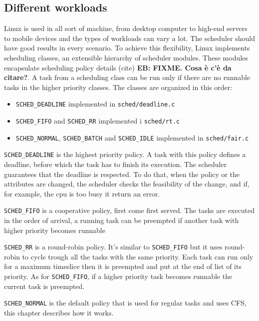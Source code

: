 \documentclass[10pt]{book}
\newcommand{\mycomment}[1]{\textbf{#1}}  %
\begin{document}
\subsection{Different workloads}  %
Linux is used in all sort of machine, from desktop computer to high-end servers to mobile devices and the types of workloads can vary a lot. The scheduler should have good results in every scenario. To achieve this flexibility, Linux implements scheduling classes, an extensible hierarchy of scheduler modules. These modules encapsulate scheduling policy details (cite) \mycomment{EB: FIXME. Cosa \`e c'\`e da citare?}. A task from a scheduling class can be run only if there are no runnable tasks in the higher priority classes. The classes are organized in this order: 
\begin{itemize}
\item \verb|SCHED_DEADLINE| implemented in \verb|sched/deadline.c|
\item \verb|SCHED_FIFO| and \verb|SCHED_RR| implemented i
  \verb|sched/rt.c|
\item \verb|SCHED_NORMAL|, \verb|SCHED_BATCH| and
  \verb|SCHED_IDLE| %
  implemented in \verb|sched/fair.c|%
\end{itemize}

\verb|SCHED_DEADLINE| is the highest priority policy. A task with this policy defines a deadline, before which the task has to finish its execution. The scheduler guarantees that the deadline is respected. To do that, when the policy or the attributes are changed, the scheduler checks the feasibility of the change, and if, for example, the cpu is too busy it return an error.

\verb|SCHED_FIFO| is a cooperative policy, first come first served. The tasks are executed in the order of arrival, a running task can be preempted if another task with higher priority becomes runnable

\verb|SCHED_RR| is a round-robin policy. It's similar to \verb|SCHED_FIFO| but it uses round-robin to cycle trough all the tasks with the same priority. Each task can run only for a maximum timeslice then it is preempted and put at the end of list of its priority. As for \verb|SCHED_FIFO|, if a higher priority task becomes runnable the current task is preempted.

\verb|SCHED_NORMAL| is the default policy that is used for regular tasks and uses CFS, this chapter describes how it works.
\end{document}
